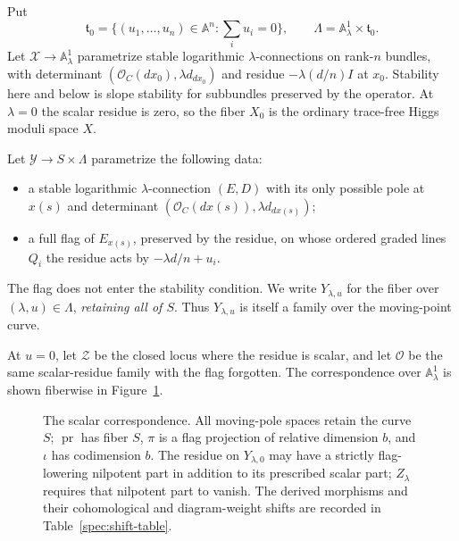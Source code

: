 Put
\[
 \mathfrak t_0=\{(u_1,\ldots,u_n)\in\mathbb A^n:
                         \textstyle\sum_i u_i=0\},\qquad
 \Lambda=\mathbb A^1_\lambda\times\mathfrak t_0.
\]
Let $\mathcal X\to\mathbb A^1_\lambda$ parametrize stable logarithmic
$\lambda$-connections on rank-$n$ bundles, with determinant
$(\mathcal O_C(d x_0),\lambda d_{d x_0})$ and residue
$-\lambda(d/n)I$ at $x_0$.  Stability here and below is slope stability for
subbundles preserved by the operator.  At $\lambda=0$ the scalar residue
is zero, so the fiber $X_0$ is the ordinary trace-free Higgs moduli space $X$.

Let $\mathcal Y\to S\times\Lambda$ parametrize the following data:
\begin{itemize}
 \item a stable logarithmic $\lambda$-connection $(E,D)$ with its only
 possible pole at $x(s)$ and determinant
 $(\mathcal O_C(d x(s)),\lambda d_{d x(s)})$;
 \item a full flag of $E_{x(s)}$, preserved by the residue, on whose
 ordered graded lines $Q_i$ the residue acts by $-\lambda d/n+u_i$.
\end{itemize}
The flag does not enter the stability condition.  We write $Y_{\lambda,u}$
for the fiber over $(\lambda,u)\in\Lambda$, \emph{retaining all of $S$}.
Thus $Y_{\lambda,u}$ is itself a family over the moving-point curve.

At $u=0$, let $\mathcal Z$ be the closed locus where the residue is scalar,
and let $\mathcal O$ be the same scalar-residue family with the flag
forgotten.  The correspondence over $\mathbb A^1_\lambda$ is shown
fiberwise in Figure~\ref{log:scalar-correspondence}.

\begin{figure}[htbp]
\centering
{}
\caption{The scalar correspondence. All moving-pole spaces retain the
curve $S$; $\operatorname{pr}$ has fiber $S$, $\pi$ is a
flag projection of relative dimension $b$, and $\iota$ has codimension
$b$. The residue on $Y_{\lambda,0}$ may have a strictly flag-lowering
nilpotent part in addition to its prescribed scalar part; $Z_\lambda$
requires that nilpotent part to vanish. The derived morphisms and their cohomological and diagram-weight shifts
are recorded in Table~\ref{spec:shift-table}.}
\label{log:scalar-correspondence}
\end{figure}

